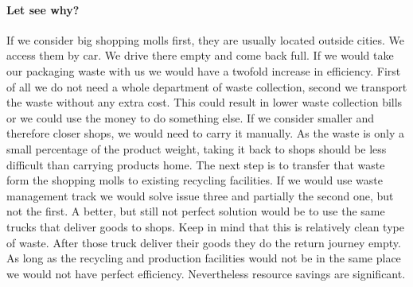 \documentclass{article}
\begin{document}
\paragraph{Let see why?}
If we consider big shopping molls first, they are usually located outside cities.
We access them by car.
We drive there empty and come back full.
If we would take our packaging waste with us we would have a twofold increase in efficiency.
First of all we do not need a whole department of waste collection, second we transport the waste without any extra cost.
This could result in lower waste collection bills or we could use the money to do something else.
If we consider smaller and therefore closer shops, we would need to carry it manually.
As the waste is only a small percentage of the product weight, taking it back to shops should be less difficult than carrying products home.
The next step is to transfer that waste form the shopping molls to existing recycling facilities.
If we would use waste management track we would solve issue three and partially the second one, but not the first.
A better, but still not perfect solution would be to use the same trucks that deliver goods to shops.
Keep in mind that this is relatively clean type of waste.
After those truck deliver their goods they do the return journey empty.
As long as the recycling and production facilities would not be in the same place we would not have perfect efficiency.
Nevertheless resource savings are significant.
\end{document}
